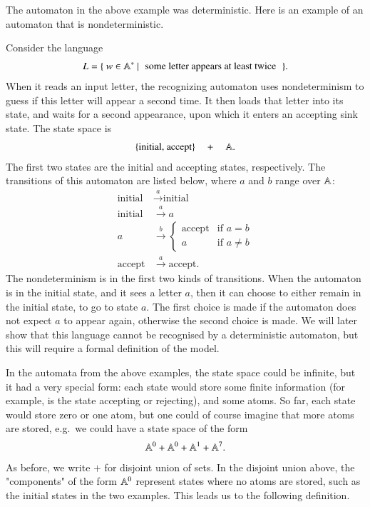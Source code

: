 The automaton in the above example was deterministic. Here is an example of an automaton that is nondeterministic.
\begin{myexample}\label{ex:pof-nfa} 
    Consider the language 
        \begin{align*}
        L = \setbuild{w \in \atoms^*}{some letter appears  at least twice}.
        \end{align*}
        When it reads an input letter, the  recognizing  automaton uses nondeterminism to guess if this letter will appear a second time. It then loads that letter into its state, and waits for a second appearance, upon which it enters an accepting sink state. The state space is 
        \begin{align*}
            \{\text{initial, accept}\} 
            \quad + \quad 
            \mathbb A.
        \end{align*}
        The first two states are the initial and accepting states, respectively. 
        The transitions of this automaton are listed below, where $a$ and $b$ range over $\mathbb A$:
        \begin{align*}
        \text{initial} & \stackrel a \to \text{initial}\\
        \text{initial} & \stackrel a \to a \\
        a & \stackrel b  \to 
        \begin{cases}
            \text{accept} & \text{if $a = b$} \\
             a & \text{if $a \neq b$}
        \end{cases}\\
        \text{accept} & \stackrel a \to \text{accept}.
        \end{align*}
        The nondeterminism is in the first two kinds of transitions. When the automaton is in the initial state, and it sees a letter $a$, then it can choose to either remain in the initial state, to go to state $a$. The first choice is made if the automaton does not expect $a$ to appear again, otherwise the second choice is made.
        We will later show that this language cannot be recognised by a deterministic automaton, but this will require a formal definition of the model.
\end{myexample}

In the automata from the above examples, the state space could be infinite, but it had a very special form: each state would store some finite information (for example, is the state accepting or rejecting), and some atoms. So far, each state would store zero or one atom, but one could of course imagine that more atoms are stored, e.g.~we could have a state space of the form 
\begin{align*}
\mathbb A^0 + \mathbb A^0 + \mathbb A^1 + \mathbb A^7.
\end{align*}
As before, we write $+$ for disjoint union of sets. In the disjoint union above,  the  "components" of the form $\mathbb A^0$ represent states where no atoms are stored, such as the initial states in the two examples.  This leads us to the following definition.

